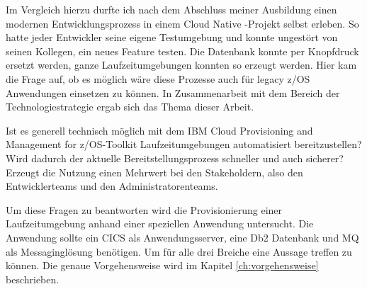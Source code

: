 Im Vergleich hierzu durfte ich nach dem Abschluss meiner Ausbildung einen modernen Entwicklungsprozess in einem \glqq Cloud Native \grqq-Projekt selbst erleben.
So hatte jeder Entwickler seine eigene Testumgebung und konnte ungestört von seinen Kollegen, ein neues Feature testen.
Die Datenbank konnte per Knopfdruck ersetzt werden, ganze Laufzeitumgebungen konnten so erzeugt werden.
Hier kam die Frage auf, ob es möglich wäre diese Prozesse auch für legacy z/OS Anwendungen einsetzen zu können.
In Zusammenarbeit mit dem Bereich der Technologiestrategie ergab sich das Thema dieser Arbeit.

Ist es generell technisch möglich mit dem \glqq IBM Cloud Provisioning and Management for z/OS\grqq-Toolkit Laufzeitumgebungen automatisiert bereitzustellen?
Wird dadurch der aktuelle Bereitstellungsprozess schneller und auch sicherer?
Erzeugt die Nutzung einen Mehrwert bei den Stakeholdern, also den Entwicklerteams und den Administratorenteams.

Um diese Fragen zu beantworten wird die Provisionierung einer Laufzeitumgebung anhand einer speziellen Anwendung untersucht.
Die Anwendung sollte ein CICS als Anwendungsserver, eine Db2 Datenbank und MQ als Messaginglösung benötigen.
Um für alle drei Breiche eine Aussage treffen zu können.
Die genaue Vorgehensweise wird im Kapitel \ref{ch:vorgehensweise} beschrieben.